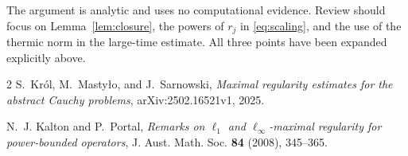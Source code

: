 \documentclass[11pt]{article}
\begin{document}
The argument is analytic and uses no computational evidence.  Review should
focus on Lemma~\ref{lem:closure}, the powers of $r_j$ in
\eqref{eq:scaling}, and the use of the thermic norm in the large-time
estimate.  All three points have been expanded explicitly above.

\begin{thebibliography}{2}
S.~Kr\'ol, M.~Masty\l o, and J.~Sarnowski,
\newblock \emph{Maximal regularity estimates for the abstract Cauchy
problems},
\newblock arXiv:2502.16521v1, 2025.

N.~J. Kalton and P.~Portal,
\newblock \emph{Remarks on $\ell_1$ and $\ell_\infty$-maximal regularity for
power-bounded operators},
\newblock J. Aust. Math. Soc. \textbf{84} (2008), 345--365.
\end{thebibliography}
\end{document}
